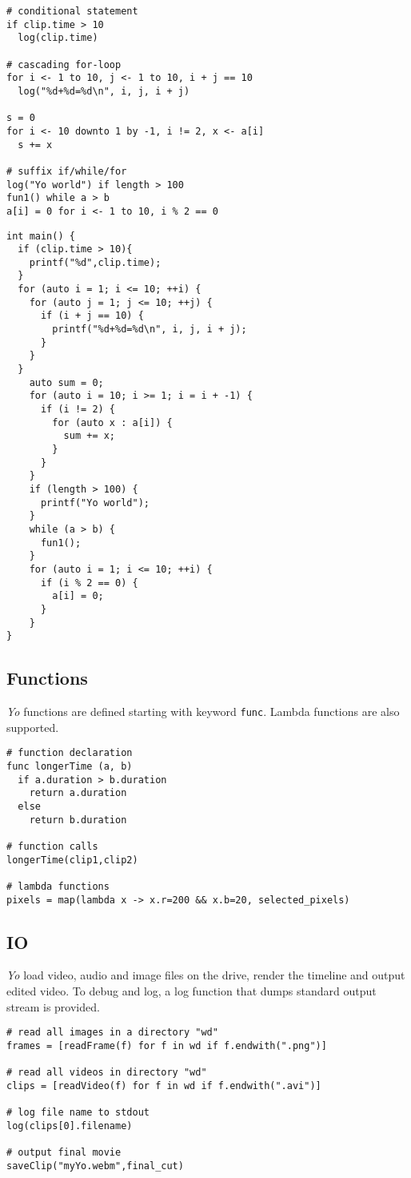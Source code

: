 \documentclass[12pt]{article}
\begin{document}
\begin{lstlisting}[caption=\textit{Yo} Control Flow Example]
# conditional statement
if clip.time > 10
  log(clip.time)
   
# cascading for-loop
for i <- 1 to 10, j <- 1 to 10, i + j == 10
  log("%d+%d=%d\n", i, j, i + j)
    
s = 0
for i <- 10 downto 1 by -1, i != 2, x <- a[i]
  s += x
    
# suffix if/while/for
log("Yo world") if length > 100
fun1() while a > b
a[i] = 0 for i <- 1 to 10, i % 2 == 0
\end{lstlisting}

\begin{lstlisting}[caption=C++ Control Flow Example]
int main() {
  if (clip.time > 10){
    printf("%d",clip.time);
  }
  for (auto i = 1; i <= 10; ++i) {
    for (auto j = 1; j <= 10; ++j) {
      if (i + j == 10) {
        printf("%d+%d=%d\n", i, j, i + j);
      }
    }
  }
    auto sum = 0;
    for (auto i = 10; i >= 1; i = i + -1) {
      if (i != 2) {
        for (auto x : a[i]) {
          sum += x;
        }
      }
    }
    if (length > 100) {
      printf("Yo world");
    }
    while (a > b) {
      fun1();
    }
    for (auto i = 1; i <= 10; ++i) {
      if (i % 2 == 0) {
        a[i] = 0;
      }
    }
}
\end{lstlisting}

\subsection{Functions}
\textit{Yo} functions are defined starting with keyword \texttt{func}. Lambda functions are also supported.
\begin{lstlisting}[caption=Function Example]
# function declaration
func longerTime (a, b)
  if a.duration > b.duration
    return a.duration
  else
    return b.duration

# function calls
longerTime(clip1,clip2)

# lambda functions
pixels = map(lambda x -> x.r=200 && x.b=20, selected_pixels)
\end{lstlisting}

\subsection{IO}
\textit{Yo} load video, audio and image files on the drive, render the  timeline and output edited video. To debug and log, a log function that dumps standard output stream is provided.
\begin{lstlisting}[caption=IO Example]
# read all images in a directory "wd"
frames = [readFrame(f) for f in wd if f.endwith(".png")]

# read all videos in directory "wd"
clips = [readVideo(f) for f in wd if f.endwith(".avi")]

# log file name to stdout
log(clips[0].filename)

# output final movie
saveClip("myYo.webm",final_cut)
\end{lstlisting}
\end{document}
